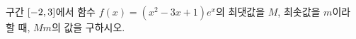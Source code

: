 구간 $[-2{,}\mkern3mu\mathopen{}3]$에서 함수 $f(x)=(x^2-3x+1)e^x$의 최댓값을 $M$, 최솟값을 $m$이라 할 때, $Mm$의 값을 구하시오.
